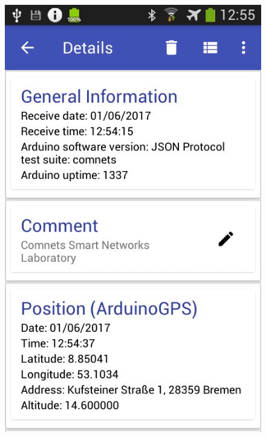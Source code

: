 \begin{figure}[h]
\centering
\begin{minipage}{.33\textwidth}
  \centering
  \includegraphics[width=.95\linewidth]{src/details_1.png}
\end{minipage}%
\begin{minipage}{.33\textwidth}
  \centering

\end{minipage}
\end{figure}

